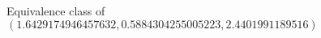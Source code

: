 \documentclass[preview]{standalone}
\begin{document}
\begin{center}
Equivalence class of $(1.6429174946457632, 0.5884304255005223, 2.4401991189516)$
\end{center}
\end{document}
